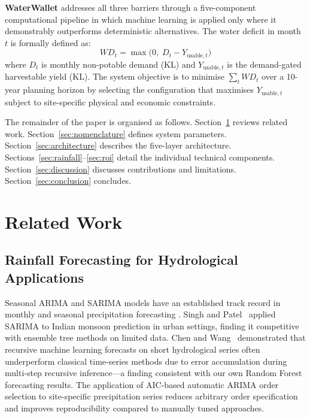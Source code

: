 ﻿\documentclass[conference]{IEEEtran}
\begin{document}
\textbf{WaterWallet} addresses all three barriers through a five-component computational pipeline in which machine learning is applied only where it demonstrably outperforms deterministic alternatives. The water deficit in month~$t$ is formally defined as:
\begin{equation}
  WD_t = \max\!\bigl(0,\; D_t - Y_{\text{usable},t}\bigr)
  \label{eq:deficit}
\end{equation}
where $D_t$ is monthly non-potable demand (KL) and $Y_{\text{usable},t}$ is the demand-gated harvestable yield (KL). The system objective is to minimise $\sum_{t} WD_t$ over a 10-year planning horizon by selecting the configuration that maximises $Y_{\text{usable},t}$ subject to site-specific physical and economic constraints.

The remainder of the paper is organised as follows. Section~\ref{sec:related} reviews related work. Section~\ref{sec:nomenclature} defines system parameters. Section~\ref{sec:architecture} describes the five-layer architecture. Sections~\ref{sec:rainfall}--\ref{sec:roi} detail the individual technical components. Section~\ref{sec:discussion} discusses contributions and limitations. Section~\ref{sec:conclusion} concludes.
\section{Related Work}
\label{sec:related}

\subsection{Rainfall Forecasting for Hydrological Applications}

Seasonal ARIMA and SARIMA models have an established track record in monthly and seasonal precipitation forecasting \cite{sharma2020, smith2020}. Singh and Patel~\cite{singh2021} applied SARIMA to Indian monsoon prediction in urban settings, finding it competitive with ensemble tree methods on limited data. Chen and Wang~\cite{chen2021} demonstrated that recursive machine learning forecasts on short hydrological series often underperform classical time-series methods due to error accumulation during multi-step recursive inference---a finding consistent with our own Random Forest forecasting results. The application of AIC-based automatic ARIMA order selection to site-specific precipitation series reduces arbitrary order specification and improves reproducibility compared to manually tuned approaches.
\end{document}
